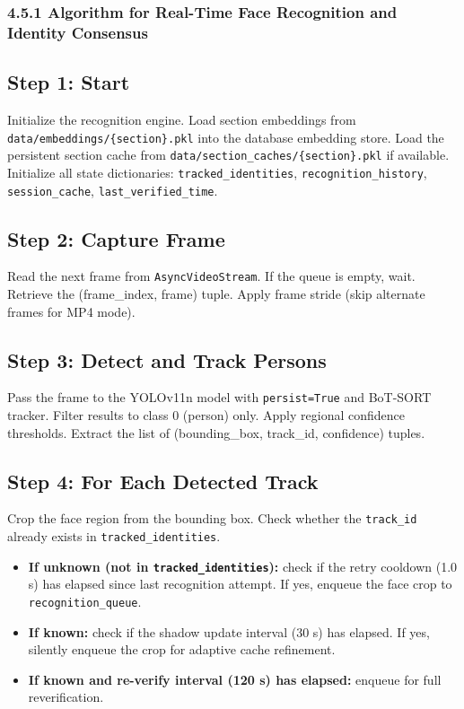 \documentclass{report}
\begin{document}
\subsubsection*{4.5.1 Algorithm for Real-Time Face Recognition and Identity Consensus}

\subsection*{Step 1: Start}
Initialize the recognition engine. Load section embeddings from \texttt{data/embeddings/\{section\}.pkl}\vspace{3pt} into the database embedding store. Load the persistent section cache from\vspace{3pt} \texttt{data/section\_caches/\{section\}.pkl} if available. Initialize all state dictionaries:\vspace{3pt} \texttt{tracked\_identities}, \texttt{recognition\_history}, \texttt{session\_cache}, \texttt{last\_verified\_time}.

\subsection*{Step 2: Capture Frame}
Read the next frame from \texttt{AsyncVideoStream}. If the queue is empty, wait. Retrieve the\vspace{3pt} (frame\_index, frame) tuple. Apply frame stride (skip alternate frames for MP4 mode).

\subsection*{Step 3: Detect and Track Persons}
Pass the frame to the YOLOv11n model with \texttt{persist=True} and BoT-SORT tracker. Filter\vspace{3pt} results to class 0 (person) only. Apply regional confidence thresholds. Extract the list of\vspace{3pt} (bounding\_box, track\_id, confidence) tuples.

\subsection*{Step 4: For Each Detected Track}
Crop the face region from the bounding box. Check whether the \texttt{track\_id} already exists in\vspace{3pt} \texttt{tracked\_identities}.

\begin{itemize}
    \item \textbf{If unknown (not in \texttt{tracked\_identities}):} check if the retry cooldown (1.0 s) has elapsed\vspace{3pt} since last recognition attempt. If yes, enqueue the face crop to \texttt{recognition\_queue}.
    \item \textbf{If known:} check if the shadow update interval (30 s) has elapsed. If yes, silently enqueue\vspace{3pt} the crop for adaptive cache refinement.
    \item \textbf{If known and re-verify interval (120 s) has elapsed:} enqueue for full reverification.
\end{itemize}
\end{document}
